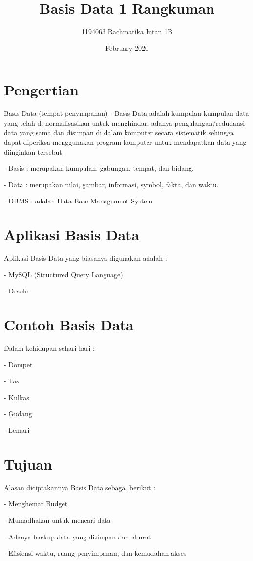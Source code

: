 \documentclass{article}
\title{Basis Data 1 Rangkuman}
\author{1194063 Rachmatika Intan 1B }
\date{February 2020}
\begin{document}
\maketitle

\section{Pengertian}
Basis Data (tempat penyimpanan)
- Basis Data adalah kumpulan-kumpulan data yang telah di normalisasikan untuk menghindari adanya pengulangan/redudansi data yang sama dan disimpan di dalam komputer secara sistematik sehingga dapat diperiksa menggunakan program komputer untuk mendapatkan data yang diinginkan tersebut.

- Basis : merupakan kumpulan, gabungan, tempat, dan bidang.

- Data : merupakan nilai, gambar, informasi, symbol, fakta, dan waktu.

- DBMS : adalah Data Base Management System
\section{Aplikasi Basis Data}
Aplikasi Basis Data yang biasanya digunakan adalah :

- MySQL (Structured Query Language)

- Oracle
\section{Contoh Basis Data}
Dalam kehidupan sehari-hari :

- Dompet

- Tas

- Kulkas

- Gudang

- Lemari
\section{Tujuan}
Alasan diciptakannya Basis Data sebagai berikut :

- Menghemat Budget

- Mumadhakan untuk mencari data

- Adanya backup data yang disimpan dan akurat

- Efisiensi waktu, ruang penyimpanan, dan kemudahan akses
\end{document}
